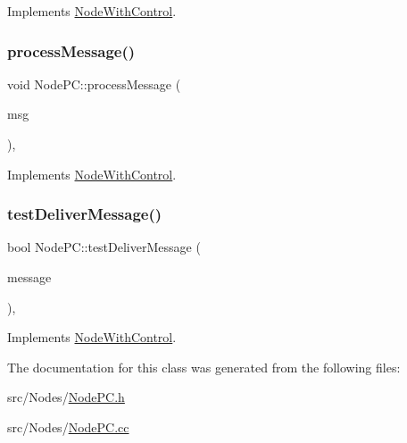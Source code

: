 Implements \hyperlink{classNodeWithControl_a4f78078272b90937e0746c797443b37d}{Node\+With\+Control}.

\mbox{\label{classNodePC_aa5fedc4136104a06e2f1131f1ba16b0e}} 
\subsubsection{\texorpdfstring{process\+Message()}{processMessage()}}
{\footnotesize\ttfamily void Node\+P\+C\+::process\+Message (\begin{DoxyParamCaption}\item[{c\+Message $\ast$}]{msg }\end{DoxyParamCaption})\hspace{0.3cm}{\ttfamily [protected]}, {\ttfamily [virtual]}}



Implements \hyperlink{classNodeWithControl_af532082fab76c38d8c50ca90e991f4c3}{Node\+With\+Control}.

\mbox{\label{classNodePC_a54731196935596e0c6f094a5a8420134}} 
\subsubsection{\texorpdfstring{test\+Deliver\+Message()}{testDeliverMessage()}}
{\footnotesize\ttfamily bool Node\+P\+C\+::test\+Deliver\+Message (\begin{DoxyParamCaption}\item[{const \hyperlink{structures_8h_a7e7bdc1d2fff8a9436f2f352b2711ed6}{message\+Info} \&}]{message }\end{DoxyParamCaption})\hspace{0.3cm}{\ttfamily [protected]}, {\ttfamily [virtual]}}



Implements \hyperlink{classNodeWithControl_a84df0beabbaed80e7da017d592480515}{Node\+With\+Control}.



The documentation for this class was generated from the following files\+:\begin{DoxyCompactItemize}
\item 
src/\+Nodes/\hyperlink{NodePC_8h}{Node\+P\+C.\+h}\item 
src/\+Nodes/\hyperlink{NodePC_8cc}{Node\+P\+C.\+cc}\end{DoxyCompactItemize}
